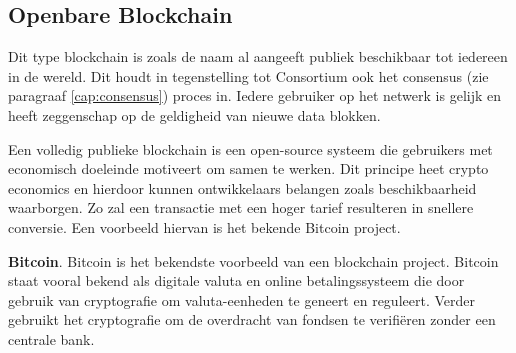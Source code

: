 \subsection{Openbare Blockchain}
Dit type blockchain is zoals de naam al aangeeft publiek beschikbaar tot iedereen in de wereld. Dit houdt in tegenstelling tot Consortium ook het consensus (zie paragraaf \ref{cap:consensus}) proces in. Iedere gebruiker op het netwerk is gelijk en heeft zeggenschap op de geldigheid van nieuwe data blokken.\par

Een volledig publieke blockchain is een open-source systeem die gebruikers met economisch doeleinde motiveert om samen te werken. Dit principe heet crypto economics en hierdoor kunnen ontwikkelaars belangen zoals beschikbaarheid waarborgen. Zo zal een transactie met een hoger tarief resulteren in snellere conversie. Een voorbeeld hiervan is het bekende Bitcoin project.

\textbf{Bitcoin}. Bitcoin is het bekendste voorbeeld van een blockchain project. Bitcoin staat vooral bekend als digitale valuta en online betalingssysteem die door gebruik van cryptografie om valuta-eenheden te geneert en reguleert. Verder gebruikt het cryptografie om de overdracht van fondsen te verifiëren zonder een centrale bank.\par
